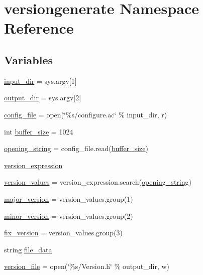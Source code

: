 \hypertarget{namespaceversiongenerate}{}\section{versiongenerate Namespace Reference}
\label{namespaceversiongenerate}
\subsection*{Variables}
\begin{DoxyCompactItemize}
\item 
\hyperlink{namespaceversiongenerate_a68af424183a162a61507cdc378cf255e}{input\+\_\+dir} = sys.\+argv\mbox{[}1\mbox{]}
\item 
\hyperlink{namespaceversiongenerate_aab714e0aa9036025ba7c83eb7422c567}{output\+\_\+dir} = sys.\+argv\mbox{[}2\mbox{]}
\item 
\hyperlink{namespaceversiongenerate_afdfd8d6de9b62e742923b2b3326798e6}{config\+\_\+file} = open(\char`\"{}\%s/configure.\+ac\char`\"{} \% input\+\_\+dir, \textquotesingle{}r\textquotesingle{})
\item 
int \hyperlink{namespaceversiongenerate_a5656c48d43f7e869041b6a30c124702e}{buffer\+\_\+size} = 1024
\item 
\hyperlink{namespaceversiongenerate_a88cc36d80d757546e04817490ebb0640}{opening\+\_\+string} = config\+\_\+file.\+read(\hyperlink{namespaceversiongenerate_a5656c48d43f7e869041b6a30c124702e}{buffer\+\_\+size})
\item 
\hyperlink{namespaceversiongenerate_a83861e707250395976fdfee3396a0fff}{version\+\_\+expression}
\item 
\hyperlink{namespaceversiongenerate_a0ce22d4ba772e519b000413a3bf5445c}{version\+\_\+values} = version\+\_\+expression.\+search(\hyperlink{namespaceversiongenerate_a88cc36d80d757546e04817490ebb0640}{opening\+\_\+string})
\item 
\hyperlink{namespaceversiongenerate_a4b536109523f1bc805806f8d76ca34ac}{major\+\_\+version} = version\+\_\+values.\+group(1)
\item 
\hyperlink{namespaceversiongenerate_af8027cbccfcda6a243f0544cc3c08b28}{minor\+\_\+version} = version\+\_\+values.\+group(2)
\item 
\hyperlink{namespaceversiongenerate_aa92fb32c5f03f516f3b6224c620b66e4}{fix\+\_\+version} = version\+\_\+values.\+group(3)
\item 
string \hyperlink{namespaceversiongenerate_aa7a8a587902d8dc493945992ec3fcf60}{file\+\_\+data}
\item 
\hyperlink{namespaceversiongenerate_a3cb3deeb1538014cd32e4253fe298e27}{version\+\_\+file} = open(\char`\"{}\%s/Version.\+h\char`\"{} \% output\+\_\+dir, \textquotesingle{}w\textquotesingle{})
\end{DoxyCompactItemize}


